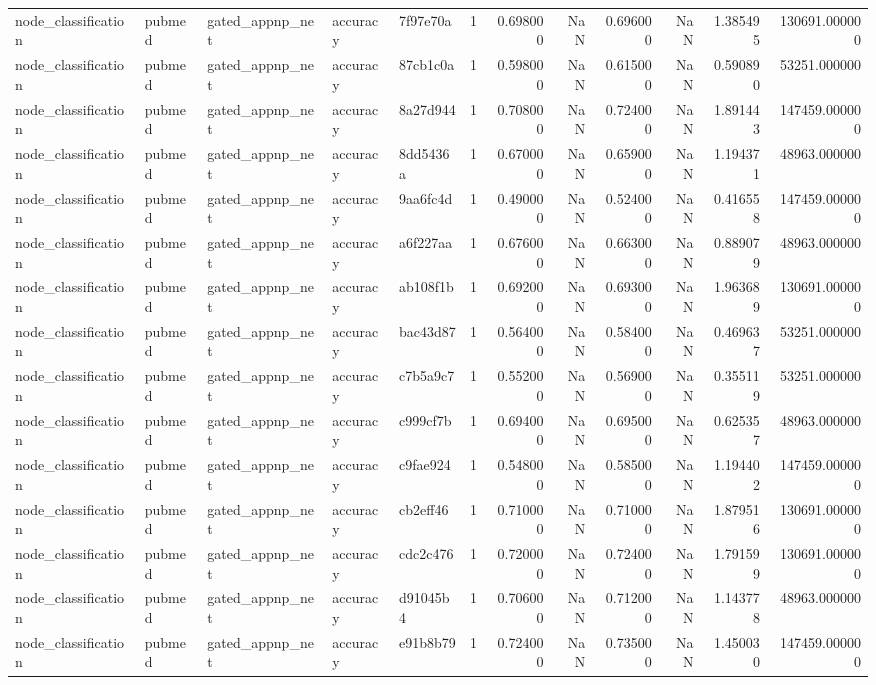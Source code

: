 \begin{tabular}{lllllrrrrrrr}
node_classification & pubmed & gated_appnp_net & accuracy & 7f97e70a & 1 & 0.698000 & NaN & 0.696000 & NaN & 1.385495 & 130691.000000 \\
node_classification & pubmed & gated_appnp_net & accuracy & 87cb1c0a & 1 & 0.598000 & NaN & 0.615000 & NaN & 0.590890 & 53251.000000 \\
node_classification & pubmed & gated_appnp_net & accuracy & 8a27d944 & 1 & 0.708000 & NaN & 0.724000 & NaN & 1.891443 & 147459.000000 \\
node_classification & pubmed & gated_appnp_net & accuracy & 8dd5436a & 1 & 0.670000 & NaN & 0.659000 & NaN & 1.194371 & 48963.000000 \\
node_classification & pubmed & gated_appnp_net & accuracy & 9aa6fc4d & 1 & 0.490000 & NaN & 0.524000 & NaN & 0.416558 & 147459.000000 \\
node_classification & pubmed & gated_appnp_net & accuracy & a6f227aa & 1 & 0.676000 & NaN & 0.663000 & NaN & 0.889079 & 48963.000000 \\
node_classification & pubmed & gated_appnp_net & accuracy & ab108f1b & 1 & 0.692000 & NaN & 0.693000 & NaN & 1.963689 & 130691.000000 \\
node_classification & pubmed & gated_appnp_net & accuracy & bac43d87 & 1 & 0.564000 & NaN & 0.584000 & NaN & 0.469637 & 53251.000000 \\
node_classification & pubmed & gated_appnp_net & accuracy & c7b5a9c7 & 1 & 0.552000 & NaN & 0.569000 & NaN & 0.355119 & 53251.000000 \\
node_classification & pubmed & gated_appnp_net & accuracy & c999cf7b & 1 & 0.694000 & NaN & 0.695000 & NaN & 0.625357 & 48963.000000 \\
node_classification & pubmed & gated_appnp_net & accuracy & c9fae924 & 1 & 0.548000 & NaN & 0.585000 & NaN & 1.194402 & 147459.000000 \\
node_classification & pubmed & gated_appnp_net & accuracy & cb2eff46 & 1 & 0.710000 & NaN & 0.710000 & NaN & 1.879516 & 130691.000000 \\
node_classification & pubmed & gated_appnp_net & accuracy & cdc2c476 & 1 & 0.720000 & NaN & 0.724000 & NaN & 1.791599 & 130691.000000 \\
node_classification & pubmed & gated_appnp_net & accuracy & d91045b4 & 1 & 0.706000 & NaN & 0.712000 & NaN & 1.143778 & 48963.000000 \\
node_classification & pubmed & gated_appnp_net & accuracy & e91b8b79 & 1 & 0.724000 & NaN & 0.735000 & NaN & 1.450030 & 147459.000000 \\

\end{tabular}

